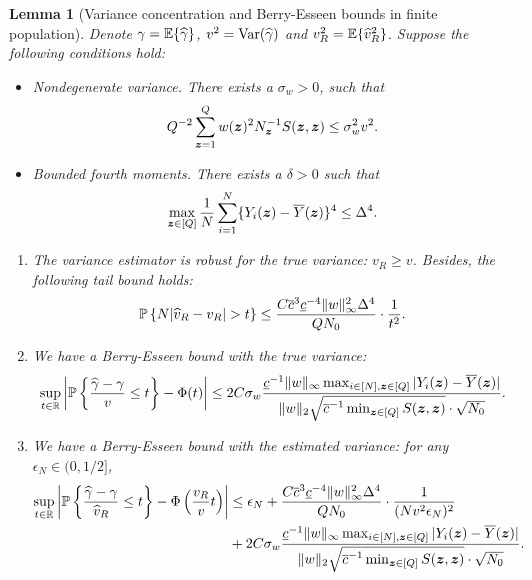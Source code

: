 \documentclass[12pt]{article}
\newtheorem{lemma}{Lemma}
\begin{document}
\begin{lemma}[Variance concentration and Berry-Esseen bounds in finite population]\label{lem:BE-finite-pop}
Denote $\gamma = {\mathbb{E}}\{{\widehat{\gamma}}\}$, $v^2 = \operatorname{Var}({\widehat{\gamma}})$ and $v^2_R = {\mathbb{E}}\{\widehat{v}^2_R\}$.
Suppose the following conditions hold: 
\begin{itemize}
    \item  Nondegenerate variance. There exists a $\sigma_w > 0$, such that
    \begin{align}\label{eqn:nondegenerate-var}
        Q^{-2}\sum_{{\boldsymbol{z}}=1}^Q w({\boldsymbol{z}})^2 N_{{\boldsymbol{z}}}^{-1} S({\boldsymbol{z}},{\boldsymbol{z}}) \le \sigma_w^2 v^2.
    \end{align}
    
    \item Bounded fourth moments. There exists a $ \delta > 0$ such that
    \begin{align}\label{eqn:bounded-moments}
    \max_{{\boldsymbol{z}}\in[Q]}\frac{1}{N}\sum_{i=1}^N \{Y_i({\boldsymbol{z}}) - \overline{Y}({\boldsymbol{z}})\}^4 \le \Delta^4.
    \end{align}
\end{itemize}


\begin{enumerate}
    \item The variance estimator is robust for the true variance:
    $v_R \ge v$. Besides, the following tail bound holds:
    \begin{align}\label{eqn:tail-vhatR}
        {\mathbb{P}}\left\{N |\widehat{v}_R-v_R | > t\right\} 
        \le \frac{C\overline{c}^3\underline{c}^{-4} \|w\|_\infty^2 \Delta^4 }{QN_0}\cdot \frac{1}{t^2}.
    \end{align}

    \item We have a Berry-Esseen bound with the true variance:
    \begin{align}\label{eqn:uniform-design-be}
       \sup_{t\in{\mathbb{R}}}\left|{{\mathbb{P}}\left\{\frac{{\widehat{\gamma}}-\gamma}{v} \le t\right\}} - \Phi(t)\right|  \le  2C\sigma_w   \frac{\underline{c}^{-1}  \|w\|_{\infty}   \max_{i\in[N],{\boldsymbol{z}}\in[Q]}|Y_i({\boldsymbol{z}})-\overline{Y}({\boldsymbol{z}})|}{\|w\|_2\sqrt{\overline{c}^{-1} \min_{{\boldsymbol{z}}\in[Q]} S({\boldsymbol{z}},{\boldsymbol{z}})}\cdot \sqrt{ N_0}} .
    \end{align}
    
    \item We have a Berry-Esseen bound with the estimated variance: for any $\epsilon_N \in (0, 1/2]$,
    \begin{align*}
        \sup_{t\in{\mathbb{R}}}\left|{\mathbb{P}}\left\{\frac{{\widehat{\gamma}} - \gamma}{\widehat{v}_R} \le t\right\} - \Phi\left(\frac{v_R}{v}t\right)\right| &\le
        \epsilon_N +  \frac{C\overline{c}^3\underline{c}^{-4} \|w\|_\infty^2 \Delta^4 }{QN_0}\cdot \frac{1}{(Nv^2\epsilon_N)^2} \\
        &+ 2C\sigma_w   \frac{\underline{c}^{-1}  \|w\|_{\infty}   \max_{i\in[N],{\boldsymbol{z}}\in[Q]}|Y_i({\boldsymbol{z}})-\overline{Y}({\boldsymbol{z}})|}{\|w\|_2\sqrt{\overline{c}^{-1} \min_{{\boldsymbol{z}}\in[Q]} S({\boldsymbol{z}},{\boldsymbol{z}})}\cdot \sqrt{N_0}}.
    \end{align*}
\end{enumerate}

\end{lemma}
\end{document}
